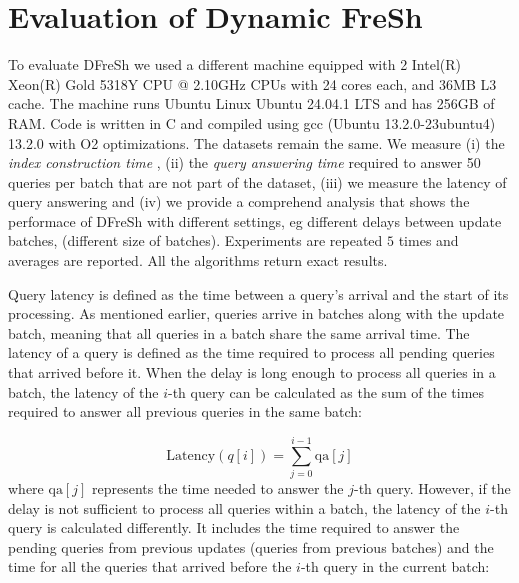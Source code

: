 \clearpage

\section{Evaluation of Dynamic FreSh}

To evaluate DFreSh we used a different machine equipped with 
2 Intel(R) Xeon(R) Gold 5318Y CPU @ 2.10GHz
CPUs with 24 cores each, and 36MB L3 cache. The machine runs
Ubuntu Linux Ubuntu 24.04.1 LTS and has 256GB of RAM. Code is written in 
C and compiled using gcc (Ubuntu 13.2.0-23ubuntu4) 13.2.0 with O2 optimizations.
 The datasets remain the same.
We measure (i) the {\em index construction time} , 
(ii) the {\em query answering time} required to answer 50 queries per batch that are not
part of the dataset, 
(iii) we measure the latency of query answering and 
(iv) we provide a comprehend analysis that shows the performace of DFreSh with 
different settings, eg different delays between update batches, (different size of batches). 
Experiments are repeated $5$ times and averages are reported. All the algorithms
return exact results.

% 
Query latency is defined as the time between a query's arrival and the start of 
its processing.
% 
As mentioned earlier, queries arrive in batches along with the update batch, meaning 
that all queries in a batch share the same arrival time. The latency of a query is 
defined as the time required to process all pending queries that arrived before it.
%
When the delay is long enough to process all queries in a batch, the latency of the 
$i$-th query can be calculated as the sum of the times required to answer all previous 
queries in the same batch:

\begin{equation}
\text{Latency}(q[i]) = \sum_{j=0}^{i-1} \text{qa}[j]
\end{equation}
% 
where $\text{qa}[j]$ represents the time needed to answer the $j$-th query.
% 
However, if the delay is not sufficient to process all queries within a batch, 
the latency of the $i$-th query is calculated differently. It includes the time 
required to answer the pending queries from previous updates (queries from previous batches) 
and the time for all the queries that arrived before the $i$-th query in the current batch:

